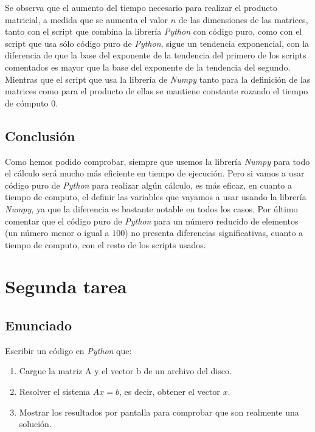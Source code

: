 \documentclass[12pt,twoside]{article}
\begin{document}
Se observa que el aumento del tiempo necesario para realizar el producto matricial, a medida que se aumenta el valor $n$ de las dimensiones de las matrices, tanto con el script que combina la librería \textit{Python} con código puro, como con el script que usa sólo código puro de \textit{Python}, sigue un tendencia exponencial, con la diferencia de que la base del exponente de la tendencia del primero de los scripts comentados es mayor que la base del exponente de la tendencia del segundo. Mientras que el script que usa la librería de \textit{Numpy} tanto para la definición de las matrices como para el producto de ellas se mantiene constante rozando el tiempo de cómputo 0.

\subsection{Conclusión}
Como hemos podido comprobar, siempre que usemos la librería \textit{Numpy} para todo el cálculo será mucho más eficiente en tiempo de ejecución. Pero si vamos a usar código puro de \textit{Python} para realizar algún cálculo, es más eficaz, en cuanto a tiempo de computo, el definir las variables que vayamos a usar usando la librería \textit{Numpy}, ya que la diferencia es bastante notable en todos los casos. Por último comentar que el código puro de \textit{Python} para un número reducido de elementos (un número menor o igual a $100$) no presenta diferencias significativas, cuanto a tiempo de computo, con el resto de los scripts usados.

\section{Segunda tarea}

\subsection{Enunciado}

Escribir un código en \textit{Python} que:

\begin{enumerate}

\item Cargue la matriz A y el vector b de un archivo del disco.

\item Resolver el sistema $Ax=b$, es decir, obtener el vector $x$.

\item Mostrar los resultados por pantalla para comprobar que son realmente una solución.

\end{enumerate}
\end{document}

